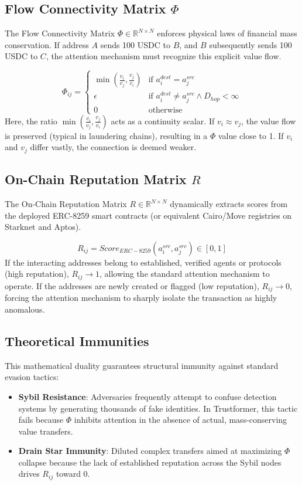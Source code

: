 \documentclass[conference,10pt]{IEEEtran}
\begin{document}
\subsection{Flow Connectivity Matrix $\Phi$}
The Flow Connectivity Matrix $\Phi \in \mathbb{R}^{N \times N}$ enforces physical laws of financial mass conservation. If address $A$ sends 100 USDC to $B$, and $B$ subsequently sends 100 USDC to $C$, the attention mechanism must recognize this explicit value flow.

\begin{equation}
\Phi_{ij} = \begin{cases} 
\min \left( \frac{v_i}{v_j}, \frac{v_j}{v_i} \right) & \text{if } a_i^{dest} = a_j^{src} \\
\epsilon & \text{if } a_i^{dest} \neq a_j^{src} \land D_{hop} < \infty \\
0 & \text{otherwise} 
\end{cases}
\end{equation}
Here, the ratio $\min(\frac{v_i}{v_j}, \frac{v_j}{v_i})$ acts as a continuity scalar. If $v_i \approx v_j$, the value flow is preserved (typical in laundering chains), resulting in a $\Phi$ value close to 1. If $v_i$ and $v_j$ differ vastly, the connection is deemed weaker.

\subsection{On-Chain Reputation Matrix $R$}
The On-Chain Reputation Matrix $R \in \mathbb{R}^{N \times N}$ dynamically extracts scores from the deployed ERC-8259 smart contracts (or equivalent Cairo/Move registries on Starknet and Aptos). 

\begin{equation}
R_{ij} = Score_{ERC-8259}(a_i^{src}, a_j^{src}) \in [0,1]
\end{equation}
If the interacting addresses belong to established, verified agents or protocols (high reputation), $R_{ij} \to 1$, allowing the standard attention mechanism to operate. If the addresses are newly created or flagged (low reputation), $R_{ij} \to 0$, forcing the attention mechanism to sharply isolate the transaction as highly anomalous.

\subsection{Theoretical Immunities}
This mathematical duality guarantees structural immunity against standard evasion tactics:
\begin{itemize}
    \item \textbf{Sybil Resistance}: Adversaries frequently attempt to confuse detection systems by generating thousands of fake identities. In Trustformer, this tactic fails because $\Phi$ inhibits attention in the absence of actual, mass-conserving value transfers.
    \item \textbf{Drain Star Immunity}: Diluted complex transfers aimed at maximizing $\Phi$ collapse because the lack of established reputation across the Sybil nodes drives $R_{ij}$ toward 0.
\end{itemize}
\end{document}
